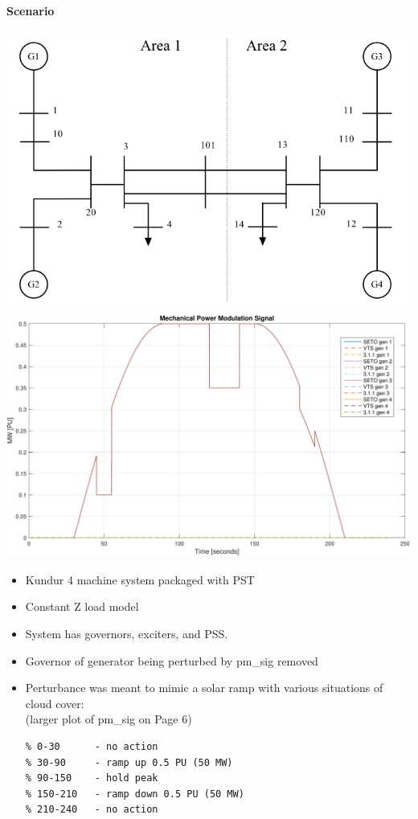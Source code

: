 \documentclass[12pt]{article}
\begin{document}
\onehalfspacing
\paragraph{Scenario} \begin{center}
\begin{minipage}{.47\linewidth}
\centering
\includegraphics[width=\linewidth]{sysOneLineAreas}
\includegraphics[width=.8\linewidth]{verPmSig}
\end{minipage} %
\begin{minipage}{.47\linewidth}
\begin{itemize}
\footnotesize
\itemsep 0em
\item Kundur  4 machine system packaged with PST
\item Constant Z load model
\item System has governors, exciters, and PSS.
\item Governor of generator being perturbed by pm\_sig removed
\item Perturbance was meant to mimic a solar ramp with various situations of cloud cover:\\
(larger plot of pm\_sig on Page 6)
\begin{Verbatim}[fontsize=\scriptsize]
% time [seconds]
% 0-30      - no action
% 30-90     - ramp up 0.5 PU (50 MW)
% 90-150    - hold peak
% 150-210   - ramp down 0.5 PU (50 MW)
% 210-240   - no action


\end{Verbatim}
\end{itemize}
\end{minipage}
\end{center}
\end{document}
